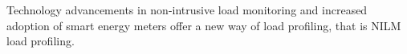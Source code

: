 
Technology advancements in non-intrusive load monitoring and increased adoption of smart energy meters offer a new
way of load profiling, that is NILM load profiling.



	
